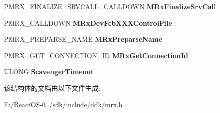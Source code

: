 \begin{DoxyCompactItemize}
\mbox{\label{struct___m_i_n_i_r_d_r___d_i_s_p_a_t_c_h_a8cf214a01e91d6ce6ff616407440e9c3}} 
P\+M\+R\+X\+\_\+\+F\+I\+N\+A\+L\+I\+Z\+E\+\_\+\+S\+R\+V\+C\+A\+L\+L\+\_\+\+C\+A\+L\+L\+D\+O\+WN {\bfseries M\+Rx\+Finalize\+Srv\+Call}
\item 
\mbox{\label{struct___m_i_n_i_r_d_r___d_i_s_p_a_t_c_h_a0f7a19a5b513f51c2d11343681454cf6}} 
P\+M\+R\+X\+\_\+\+C\+A\+L\+L\+D\+O\+WN {\bfseries M\+Rx\+Dev\+Fcb\+X\+X\+X\+Control\+File}
\item 
\mbox{\label{struct___m_i_n_i_r_d_r___d_i_s_p_a_t_c_h_aa34a155e969ff015630c7c9fc2ed2b25}} 
P\+M\+R\+X\+\_\+\+P\+R\+E\+P\+A\+R\+S\+E\+\_\+\+N\+A\+ME {\bfseries M\+Rx\+Preparse\+Name}
\item 
\mbox{\label{struct___m_i_n_i_r_d_r___d_i_s_p_a_t_c_h_a0d13acc064e277a3249574fff441260c}} 
P\+M\+R\+X\+\_\+\+G\+E\+T\+\_\+\+C\+O\+N\+N\+E\+C\+T\+I\+O\+N\+\_\+\+ID {\bfseries M\+Rx\+Get\+Connection\+Id}
\item 
\mbox{\label{struct___m_i_n_i_r_d_r___d_i_s_p_a_t_c_h_a66ed34165bf260d4dd837538fed39f07}} 
U\+L\+O\+NG {\bfseries Scavenger\+Timeout}
\end{DoxyCompactItemize}


该结构体的文档由以下文件生成\+:\begin{DoxyCompactItemize}
\item 
E\+:/\+React\+O\+S-\/0../sdk/include/ddk/mrx.\+h\end{DoxyCompactItemize}
